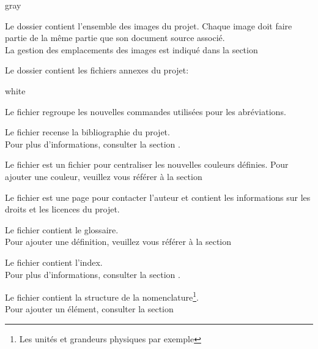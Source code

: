     \begin{items}{gray}{\faFolder}
    \item Le dossier  contient l'ensemble des images du projet.
    Chaque image doit faire partie de la même partie que son document source associé.\\

    La gestion des emplacements des images est indiqué dans la section \\

    \item Le dossier  contient les fichiers annexes du projet: 
    \begin{items}{white}{}
        \item Le fichier  regroupe les nouvelles commandes utilisées pour les abréviations.

        \item Le fichier  recense la bibliographie du projet. \\Pour plus d'informations, consulter la section .

        \item Le fichier  est un fichier pour centraliser les nouvelles couleurs définies.
        Pour ajouter une couleur, veuillez vous référer à la section 

        \item Le fichier  est une page pour contacter l'auteur et contient les informations sur les 
        droits et les licences du projet.

        \item Le fichier  contient le glossaire.\\ Pour ajouter une définition, 
        veuillez vous référer à la section 
        
        \item Le fichier  contient l'index. \\Pour plus d'informations, consulter la section .

        \item Le fichier  contient la structure de la nomenclature\footnote{Les unités et 
        grandeurs physiques par exemple}.\\
        Pour ajouter un élément, consulter la section 


\end{items}
\end{items}
